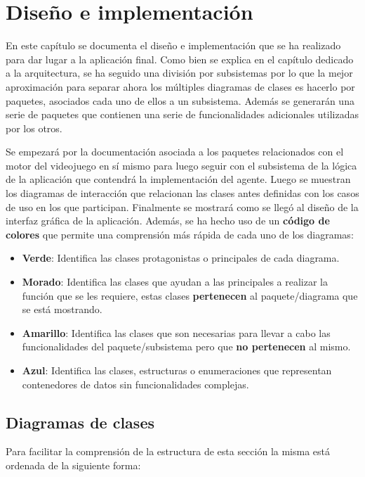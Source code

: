 \chapter{Diseño e implementación}
\label{cap:diseno}
En este capítulo se documenta el diseño e implementación que se ha realizado para dar lugar a la aplicación final. Como bien se explica en el capítulo dedicado a la arquitectura, se ha seguido una división por subsistemas por lo que la mejor aproximación para separar ahora los múltiples diagramas de clases es hacerlo por paquetes, asociados cada uno de ellos a un subsistema. Además se generarán una serie de paquetes que contienen una serie de funcionalidades adicionales utilizadas por los otros.

\bigskip

Se empezará por la documentación asociada a los paquetes relacionados con el motor del videojuego en sí mismo para luego seguir con el subsistema de la lógica de la aplicación que contendrá la implementación del agente. Luego se muestran los diagramas de interacción que relacionan las clases antes definidas con los casos de uso en los que participan. Finalmente se mostrará como se llegó al diseño de la interfaz gráfica de la aplicación. Además, se ha hecho uso de un \textbf{código de colores} que permite una comprensión más rápida de cada uno de los diagramas:

\begin{itemize}
	\item \textbf{Verde}: Identifica las clases protagonistas o principales de cada diagrama.
	\item \textbf{Morado}: Identifica las clases que ayudan a las principales a realizar la función que se les requiere, estas clases \textbf{pertenecen} al paquete/diagrama que se está mostrando.
	\item \textbf{Amarillo}: Identifica las clases que son necesarias para llevar a cabo las funcionalidades del paquete/subsistema pero que \textbf{no pertenecen} al mismo.
	\item \textbf{Azul}: Identifica las clases, estructuras o enumeraciones que representan contenedores de datos sin funcionalidades complejas.
\end{itemize}

\section{Diagramas de clases}

Para facilitar la comprensión de la estructura de esta sección la misma está ordenada de la siguiente forma:

